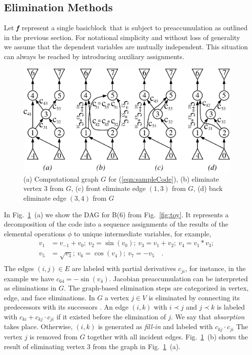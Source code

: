 \documentclass[11pt]{article}
\newcommand{\basicblock}{basicblock}
\newcommand{\bmf}{\mbox{\bf\em f}}
\newcommand{\reffig}[1]{{Fig.~\ref{#1}}}
\newcommand{\refeqn}[1]{{(\ref{#1})}}
\begin{document}
\subsection{Elimination Methods} \label{ssec:elimMeth}
Let $\bmf$ represent a single \basicblock\ that is subject to preaccumulation
as outlined in the previous section.
For notational simplicity and without loss of generality we assume that the 
dependent variables are mutually independent. 
This situation can always be
reached by introducing auxiliary assignments.
\begin{figure}
\centering\includegraphics[width=.7\textwidth]{elims}
\caption{
(a) Computational graph $G$ for \refeqn{eqn:sampleCode}, 
(b) eliminate vertex 3 from $G$, 
(c) front eliminate edge $(1,3)$ from $G$, 
(d) back eliminate edge $(3,4)$ from $G$} 
\label{fig:elims}
\end{figure}
In \reffig{fig:elims}~(a) we show the DAG for B(6) from \reffig{fig:toy}. 
It represents a decomposition of the code into a sequence assignments of
the results of the elemental operations $\phi$ to unique intermediate 
variables,
for example,
\begin{equation}\label{eqn:sampleCode}
\begin{split}
 v_1&=v_{-1}+v_0;~v_2=\sin(v_0);~v_3=v_1+v_2;~v_4=v_1*v_3; \\
v_5&=\sqrt{v_3};~v_6=\cos(v_4);~v_7=-v_5 \quad .\\
\end{split}
\end{equation}
The edges $(i,j)\in E$ are labeled with partial derivatives
$c_{ji}$, for instance, in the 
example we have $c_{64}=-\sin(v_4)$.
Jacobian preaccumulation can be interpreted as eliminations in $G$.
The graph-based elimination steps are categorized in vertex, edge, and face 
eliminations. 
In $G$ a vertex $j \in V$ is eliminated by connecting its predecessors with
its successors \cite{GrRe91}.
An edge $(i,k)$ with
$i \prec j$ and $j \prec k$ is labeled with
$c_{ki}+c_{kj} \cdot c_{ji}$ if it existed before the elimination of $j.$
We say that {\em absorption} takes place.
Otherwise, $(i,k)$ is generated as {\em fill-in} and labeled
with $c_{kj} \cdot c_{ji}$
The vertex $j$ is removed from
$G$ together with all incident edges. 
\reffig{fig:elims}~(b) shows the result of eliminating vertex $3$
from the graph in \reffig{fig:elims}~(a).
\end{document}
